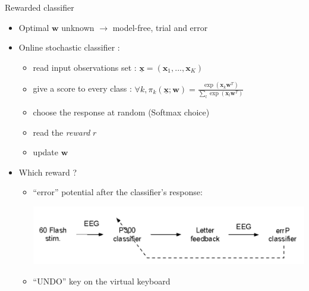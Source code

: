 \documentclass{beamer}
\begin{document}
\begin{frame}{Rewarded classifier}
 \begin{itemize}
  \item Optimal $\boldsymbol{w}$ unknown $\rightarrow$ model-free, trial and error
  \item Online stochastic classifier :
  \begin{itemize}
    \item read input observations set : $\underline{\mathbf{x}} = (\boldsymbol{x}_1,...,\boldsymbol{x}_K)$
    \item give a score to every class : $\forall k, \pi_k(\underline{\mathbf{x}};\boldsymbol{w}) =  \frac{\exp(\boldsymbol{x}_k \boldsymbol{w}^T)}
                                             {\sum_{l}  \exp(\boldsymbol{x}_l \boldsymbol{w}^T)}$ 
    \item choose the response at random (Softmax choice)
    \item read the \emph{reward} $r$
    \item update $\boldsymbol{w}$
  \end{itemize}
  \item Which reward ?
  \begin{itemize}
    \item ``error'' potential after the classifier's response:
 \centerline{\includegraphics[width=0.7\linewidth]{online_P300.pdf}}
    \item ``UNDO'' key on the virtual keyboard
  \end{itemize}
 \end{itemize}

\end{frame}
\end{document}
